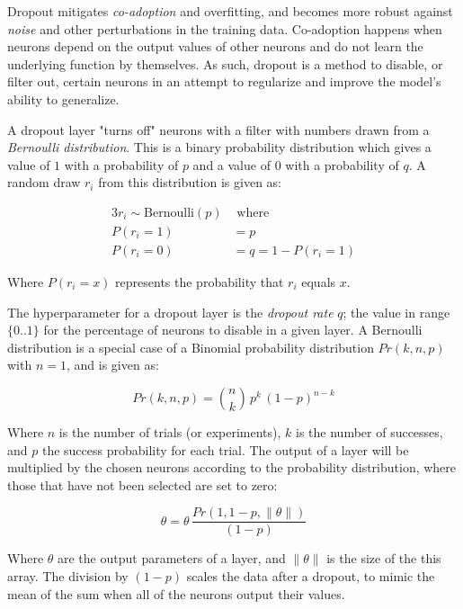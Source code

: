 \documentclass[a4paper]{article}
\begin{document}
Dropout mitigates \emph{co-adoption} and overfitting, and becomes more robust against \emph{noise} and other perturbations in the training data. Co-adoption happens when neurons depend on the output values of other neurons and do not learn the underlying function by themselves. As such, dropout is a method to disable, or filter out, certain neurons in an attempt to regularize and improve the model's ability to generalize.

A dropout layer "turns off" neurons with a filter with numbers drawn from a \emph{Bernoulli distribution}. This is a binary probability distribution which gives a value of $1$ with a probability of $p$ and a value of $0$ with a probability of $q$. A random draw $r_i$ from this distribution is given as:

\begin{alignat*}{3}
    r_i \sim \text{Bernoulli}(p) &\text{ where } \\
    P(r_i=1) &= p \\
    P(r_i=0) &= q = 1 - P(r_i=1)
\end{alignat*}

Where $P(r_i=x)$ represents the probability that $r_i$ equals $x$.

The hyperparameter for a dropout layer is the \emph{dropout rate} $q$; the value in range $\{0..1\}$ for the percentage of neurons to disable in a given layer. A Bernoulli distribution is a special case of a Binomial probability distribution $Pr(k,n,p)$ with $n=1$, and is given as:

\begin{equation*}
    Pr(k,n,p) = \binom{n}{k} \, p^k \, (1-p)^{n-k}
\end{equation*}

Where $n$ is the number of trials (or experiments), $k$ is the number of successes, and $p$ the success probability for each trial. The output of a layer will be multiplied by the chosen neurons according to the probability distribution, where those that have not been selected are set to zero:

\begin{equation*}
    \theta = \theta \, \frac{Pr(1, 1-p, \|\theta\|)}{(1-p)}
\end{equation*}

Where $\theta$ are the output parameters of a layer, and $\|\theta\|$ is the size of the this array. The division by $(1-p)$ scales the data after a dropout, to mimic the mean of the sum when all of the neurons output their values.
\end{document}
